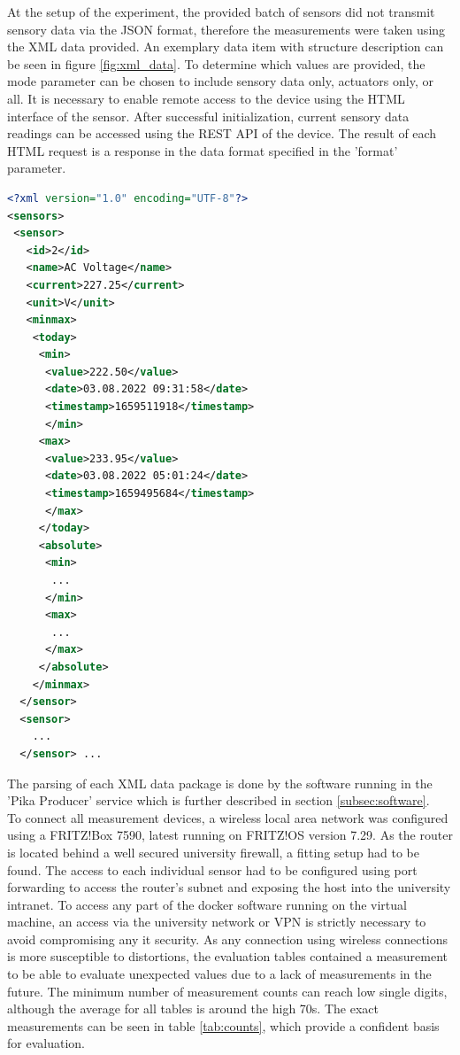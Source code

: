 At the setup of the experiment, the provided batch of sensors did not transmit sensory data via the JSON format, therefore the measurements were taken using the XML data provided. An exemplary data item with structure description can be seen in figure \ref{fig:xml_data}.
To determine which values are provided, the mode parameter can be chosen to include sensory data only, actuators only, or all. It is necessary to enable remote access to the device using the HTML interface of the sensor. After successful initialization, current sensory data readings can be accessed using the REST API of the device. The result of each HTML request is a response in the data format specified in the 'format' parameter.
\newpage

\begin{lstlisting}[language=xml, caption={Example data item from a power measurement}, label={fig:xml_data}]
<?xml version="1.0" encoding="UTF-8"?>
<sensors>
 <sensor>
   <id>2</id>
   <name>AC Voltage</name>
   <current>227.25</current>
   <unit>V</unit>
   <minmax>
    <today>
     <min>
      <value>222.50</value>
      <date>03.08.2022 09:31:58</date>
      <timestamp>1659511918</timestamp>
      </min>
     <max>
      <value>233.95</value>
      <date>03.08.2022 05:01:24</date>
      <timestamp>1659495684</timestamp>
      </max>
     </today>
     <absolute>
      <min>
       ...
      </min>
      <max>
       ...
      </max>
     </absolute>
    </minmax>
  </sensor>
  <sensor>
    ...
  </sensor> ...
\end{lstlisting}

The parsing of each XML data package is done by the software running in the 'Pika Producer' service which is further described in section \ref{subsec:software}.
\\
To connect all measurement devices, a wireless local area network was configured using a FRITZ!Box 7590, latest running on FRITZ!OS version 7.29.
As the router is located behind a well secured university firewall, a fitting setup had to be found. 
The access to each individual sensor had to be configured using port forwarding to access the router's subnet and exposing the host into the university intranet. To access any part of the docker software running on the virtual machine, an access via the university network or VPN is strictly necessary to avoid compromising any it security. As any connection using wireless connections is more susceptible to distortions, the evaluation tables contained a measurement to be able to evaluate unexpected values due to a lack of measurements in the future. The minimum number of measurement counts can reach low single digits, although the average for all tables is around the high 70s. The exact measurements can be seen in table \ref{tab:counts}, which provide a confident basis for evaluation.

